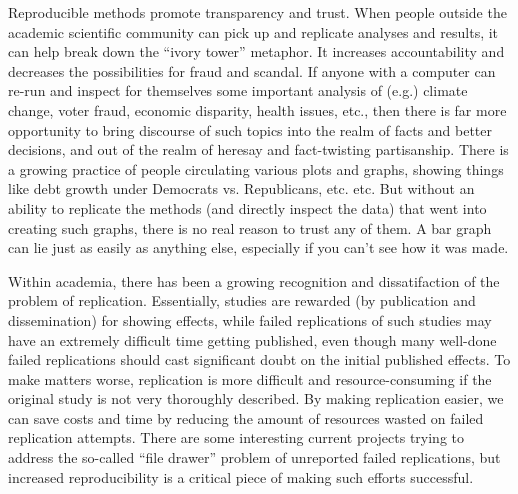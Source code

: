 \documentclass[11pt]{book}
\begin{document}
Reproducible methods promote transparency and trust.  When people outside the academic scientific community can pick up and replicate analyses and results, it can help break down the ``ivory tower'' metaphor.  It increases accountability and decreases the possibilities for fraud and scandal. If anyone with a computer can re-run and inspect for themselves some important analysis of (e.g.) climate change, voter fraud, economic disparity, health issues, etc., then there is far more opportunity to bring discourse of such topics into the realm of facts and better decisions, and out of the realm of heresay and fact-twisting partisanship.  There is a growing practice of people circulating various plots and graphs, showing things like debt growth under Democrats vs. Republicans, etc. etc.  But without an ability to replicate the methods (and directly inspect the data) that went into creating such graphs, there is no real reason to trust any of them.  A bar graph can lie just as easily as anything else, especially if you can't see how it was made. 

Within academia, there has been a growing recognition and dissatifaction of the problem of replication. Essentially, studies are rewarded (by publication and dissemination) for showing effects, while failed replications of such studies may have an extremely difficult time getting published, even though many well-done failed replications should cast significant doubt on the initial published effects. To make matters worse, replication is more difficult and resource-consuming if the original study is not very thoroughly described. By making replication easier, we can save costs and time by reducing the amount of resources wasted on failed replication attempts. There are some interesting current projects trying to address the so-called ``file drawer'' problem of unreported failed replications, but increased reproducibility is a critical piece of making such efforts successful.
\end{document}
